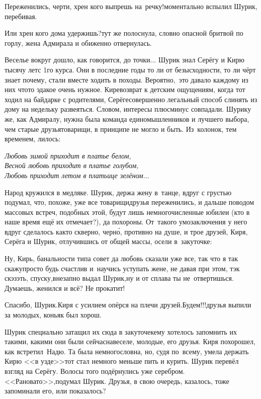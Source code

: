 {\diagdash Переженились, черти, хрен кого выпрешь на~речку!\mdash моментально вспылил Шурик, перебивая.

\diagdash Или хрен кого дома удержишь?\mdash тут же полоснула, словно опасной бритвой по горлу, жена Адмирала и обиженно отвернулась. 

Веселье вокруг дошло, как говорится, до точки$\ldots$ Шурик знал Серёгу и Кирю тысячу лет\mdash с 1\sdash го курса. Они в последние годы то ли от безысходности, то ли чёрт знает почему, стали вместе ходить в походы. Вероятно,~это давало каждому из них что\sdash то эдакое очень нужное. Кире\mdash возврат к детским ощущениям, когда тот ходил на байдарке с родителями, Серёге\mdash совершенно легальный способ слинять из дому на недельку развеяться. Словом, интересы плюс\sdash минус совпадали. Шурику же, как Адмиралу, нужна была команда единомышленников и лучшего выбора, чем старые друзья\sdash товарищи, в принципе не могло и быть. Из~колонок, тем временем, лилось:

\vspace{0.3cm}
\noindent\textit{%
	\hspace*{1.4cm}Любовь зимой приходит в платье белом,\\
	\hspace*{1.4cm}Весной любовь приходит в платье голубом,\\
	\hspace*{1.4cm}Любовь приходит летом в платьице зелёном$\ldots$
}
\vspace{0.3cm}

Народ кружился в медляке. Шурик, держа жену в~танце, вдруг с грустью подумал, что, похоже, уже все товарищи\sdash друзья переженились, и дальше поводом массовых встреч, подобных этой, будут лишь немногочисленные юбилеи (кто в наше время ещё их отмечает?), да похороны. От~такого умозаключения у него вдруг сделалось как\sdash то скверно, черн\'{о}, противно на душе, и трое друзей, Киря, Серёга и Шурик, отлучившись от общей массы, осели в~закуточке:

\diagdash Ну, Кирь, банальности типа совет да любовь сказали уже все, так что я так скажу\mdash просто будь счастлив и~научись уступать жене, не давая при этом, тэк скэзэть, спуску,\mdash внезапно выдал Шурик,\mdash ну и от сплава ты не~отвертишься. Думаешь, женился и всё? Не прокатит!

\diagdash Спасибо, Шурик.\mdash Киря с усилием опёрся на плечи друзей.\mdash Будем!!!\mdash друзья выпили за молодых, коньяк был хорош.

Шурик специально затащил их сюда в закуточек\mdash ему хотелось запомнить их такими, какими они были сейчас\mdash навеселе, молодые, его друзья. Киря похорошел, как встретил~Надю. Та была немногословна, но, судя по~всему, умела держать Кирю <<в узде>>\mdash тот стал немного меньше пить и курить. Шурик перевёл взгляд на Серёгу. Волосы того подёрнулись уже серебром. <<Рановато>>,\mdash подумал Шурик. Друзья, в свою очередь, казалось, тоже запоминали его, или показалось?

}
